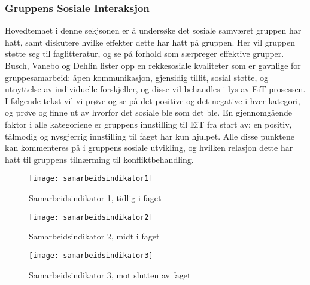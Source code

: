 \subsubsection{Gruppens Sosiale Interaksjon}

Hovedtemaet i denne sekjsonen er å undersøke det sosiale samværet gruppen har hatt, samt diskutere hvilke effekter dette har hatt på gruppen. Her vil gruppen støtte seg til faglitteratur\cite{orgorg}, og se på forhold som særpreger effektive grupper. Busch, Vanebo og Dehlin\cite[p.~257]{orgorg} lister opp en rekkesosiale kvaliteter som er gavnlige for gruppesamarbeid: åpen kommunikasjon, gjensidig tillit, sosial støtte, og utnyttelse av individuelle forskjeller, og disse vil behandles i lys av EiT prosessen. I følgende tekst vil vi prøve og se på det positive og det negative i hver kategori, og prøve og finne ut av hvorfor det sosiale ble som det ble. En gjennomgående faktor i alle kategoriene er gruppens innstilling til EiT fra start av; en positiv, tålmodig og nysgjerrig innstilling til faget har kun hjulpet. Alle disse punktene kan kommenteres på i gruppens sosiale utvikling, og hvilken relasjon dette har hatt til gruppens tilnærming til konfliktbehandling. 

\begin{figure}[h!]
  \caption{Samarbeidsindikator 1, tidlig i faget}
  \centering
    \texttt{[image: samarbeidsindikator1]}
\end{figure}\label{samarbeidsindikator1}

\begin{figure}[h!]
  \caption{Samarbeidsindikator 2, midt i faget}
  \centering
    \texttt{[image: samarbeidsindikator2]}
\end{figure}\label{samarbeidsindikator2}

\begin{figure}[h!]
  \caption{Samarbeidsindikator 3, mot slutten av faget}
  \centering
    \texttt{[image: samarbeidsindikator3]}
\end{figure}\label{samarbeidsindikator3}

